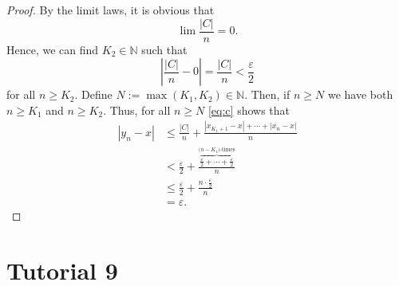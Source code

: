 \documentclass[12pt, reqno]{article}
\numberwithin{equation}{section}
\theoremstyle{definition}
\theoremstyle{remark}
\newcommand{\NN}{\mathbb{N}}
\newcommand{\abs}[1]{\left\lvert#1\right\rvert}
\renewcommand{\epsilon}{\varepsilon}
\begin{document}
\begin{enumerate}[leftmargin=*]
\begin{proof}
		      By the limit laws, it is obvious that
		      \[
			      \lim \frac{\abs{C}}{n} = 0.
		      \]
		      Hence, we can find $K_2 \in \NN$ such that
		      \[
			      \abs{ \frac{\abs{C}}{n}  - 0} = \frac{\abs{C}}{n} < \frac{\epsilon}{2}
		      \]
		      for all $n \geq K_2$. Define $N := \max(K_1,K_2) \in \NN$. Then, if $n \geq N$ we have both $n \geq K_1$ and $n \geq K_2$. Thus, for all $n \geq N$ \eqref{eq:c} shows that
		      \begin{align*}
			      \abs{ y_n - x } & \leq \frac{\abs{C}}{n} + {\frac{ \abs{x_{K_1 +1} - x}  + \cdots + \abs{x_n - x} }{n}}                                     \\
			                      & < \frac{\epsilon}{2}  + \frac{ \overbrace{\frac{\epsilon}{2} + \cdots + \frac{\epsilon}{2}}^{\text{($n-K_1$)-times} }}{n} \\
			                      & \leq \frac{\epsilon}{2} + \frac{n \cdot \frac{\epsilon}{2}}{n}                                                            \\
			                      & = \epsilon.
		      \end{align*}
	      \end{proof}
\end{enumerate}

\section*{Tutorial 9}
\end{document}
